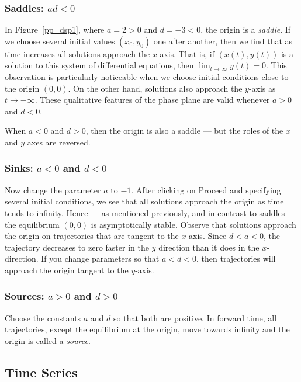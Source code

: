 \documentclass{ximera}
\begin{document}
\subsubsection*{Saddles: $ad<0$} 

In Figure~\ref{pp_dsp1}, where $a=2>0$ and $d=-3<0$, the origin is a
{\em saddle\/}.  If we choose several initial values $(x_0,y_0)$
one after another,  then we find that as time increases all
solutions approach the $x$-axis.  That is, if $(x(t),y(t))$ is a 
solution to this system of differential equations, then 
$\lim_{t\to\infty}y(t)=0$.  This observation is particularly 
noticeable when we choose initial conditions close to the origin $(0,0)$.  
On the other hand, solutions also approach the $y$-axis as $t\to-\infty$.
These qualitative features of the phase plane are valid whenever 
$a>0$ and $d<0$.
 
When $a<0$ and $d>0$, then the origin is also a saddle ---
but the roles of the $x$ and $y$ axes are reversed.

\subsubsection*{Sinks: $a<0$ and $d<0$} 

Now change the parameter $a$ to $-1$. After clicking on {\sf
Proceed} and specifying several initial conditions, we see that
all solutions approach the origin as time tends to infinity.
Hence --- as mentioned previously, and in contrast to saddles ---
the equilibrium $(0,0)$ is asymptotically stable.  Observe that
solutions approach the origin on trajectories that are tangent to
the $x$-axis.  Since $d<a<0$, the trajectory decreases to zero faster
in the $y$ direction than it does in the $x$-direction.  If
you change parameters so that $a<d<0$, then trajectories will
approach the origin tangent to the $y$-axis.

\subsubsection*{Sources: $a>0$ and $d>0$} 

Choose the constants $a$ and $d$ so that both are positive.
In forward time, all trajectories, except the equilibrium at the
origin, move towards infinity and the origin is called a
{\em source\/}.

\subsection*{Time Series} 
\end{document}
